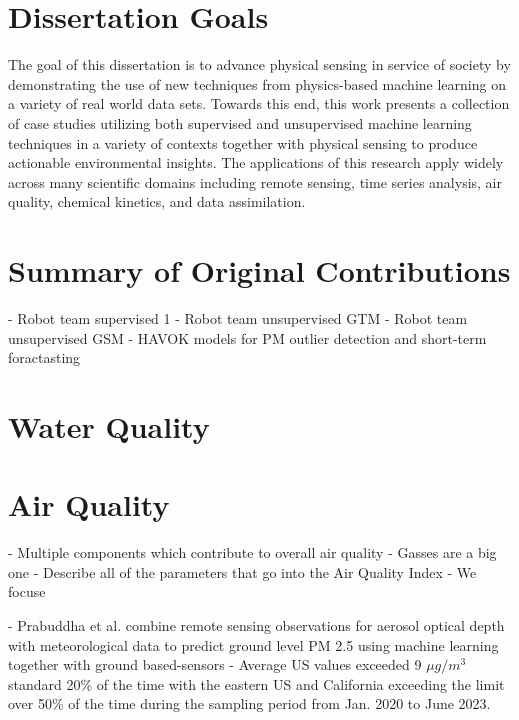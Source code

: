 

\section{Dissertation Goals}


The goal of this dissertation is to advance physical sensing in service of society by demonstrating the use of new techniques from physics-based machine learning on a variety of real world data sets. Towards this end, this work presents a collection of case studies utilizing both supervised and unsupervised machine learning techniques in a variety of contexts together with physical sensing to produce actionable environmental insights. The applications of this research apply widely across many scientific domains including remote sensing, time series analysis, air quality, chemical kinetics, and data assimilation.




\section{Summary of Original Contributions}

- Robot team supervised 1
- Robot team unsupervised GTM
- Robot team unsupervised GSM
- HAVOK models for PM outlier detection and short-term foractasting









\section{Water Quality}
\section{Air Quality}

- Multiple components which contribute to overall air quality
- Gasses are a big one
- Describe all of the parameters that go into the Air Quality Index
- We focuse

- Prabuddha et al. combine remote sensing observations for aerosol optical depth
with meteorological data to predict ground level PM 2.5 using machine learning
together with ground based-sensors \cite{prabuddha-pm-satellite}
- Average US values exceeded 9 $\mu g/m^3$ standard 20\% of the time with the
eastern US and California exceeding the limit over 50\% of the time during the
sampling period from Jan. 2020 to June 2023.

